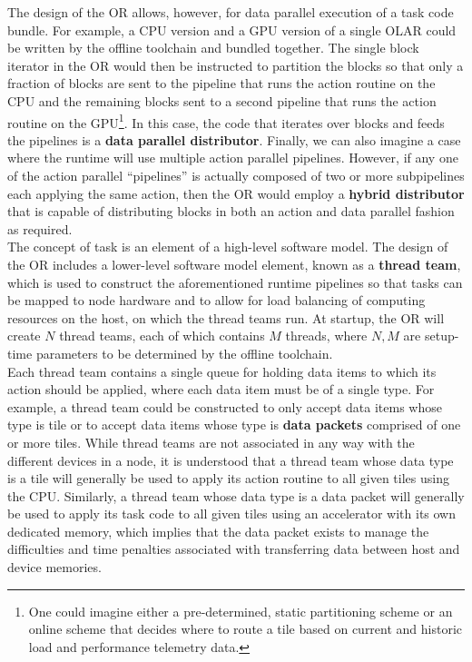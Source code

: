 \documentclass{article}
\newcommand{\shortOLAR}  {OLAR\xspace}
\newcommand{\shortOR}   {OR\xspace}
\newcommand{\OLAR}   {\shortOLAR}             %
\newcommand{\OR}        {\shortOR}
\newcommand{\taskcodebundle}     {task code bundle\xspace}
\newcommand{\actionroutine}        {action routine\xspace}       %
\begin{document}
The design of the \OR allows, however, for data parallel execution of a \taskcodebundle.
For example, a CPU version and a GPU version of a single \OLAR could be
written by the offline toolchain and bundled together.  The single block
iterator in the \OR would then be instructed to partition the blocks so that
only a fraction of blocks are sent to the pipeline that runs the \actionroutine on the CPU
and the remaining blocks sent to a second pipeline that runs the \actionroutine on the
GPU\footnote{One could imagine either a pre-determined, static partitioning
scheme or an online scheme that decides where to route a tile based on current
and historic load and performance telemetry data.}.  In this case, the code that
iterates over blocks and feeds the pipelines is a \textbf{data parallel
distributor}.  Finally, we can also imagine a case where the runtime will use
multiple action parallel pipelines.  However, if any one of the action parallel
``pipelines'' is actually composed of two or more subpipelines each applying the
same action, then the \OR would employ a \textbf{hybrid distributor} that is
capable of distributing blocks in both an action and data parallel fashion as
required.\\

The concept of task is an element of a high-level software model.  The design of
the \OR includes a lower-level software model element, known as a
\textbf{thread team}, which is used to construct the aforementioned runtime
pipelines so that tasks can be mapped to node hardware and to allow for load
balancing of computing resources on the host, on which the thread teams run.
At startup, the \OR will create $N$ thread teams, each of which contains $M$
threads, where $N, M$ are setup-time parameters to be determined by the offline
toolchain.\\

Each thread team contains a single queue for holding data items to which its
action should be applied, where each data item must be of a single type.  For
example, a thread team could be constructed to only accept data items whose type
is tile or to accept data items whose
type is \textbf{data packets} comprised
of one or more tiles.
  While thread teams are not associated in any way with the
different devices in a node, it is understood that a thread team whose data type
is a tile will generally be used to apply its \actionroutine to all given tiles
using the CPU.  Similarly, a thread team whose data type is a data packet
will generally be used to apply its task code to all given tiles using an
accelerator with its own dedicated memory, which implies that the data packet
exists to manage the difficulties and time penalties associated with
transferring data between host and device memories.\\
\end{document}
